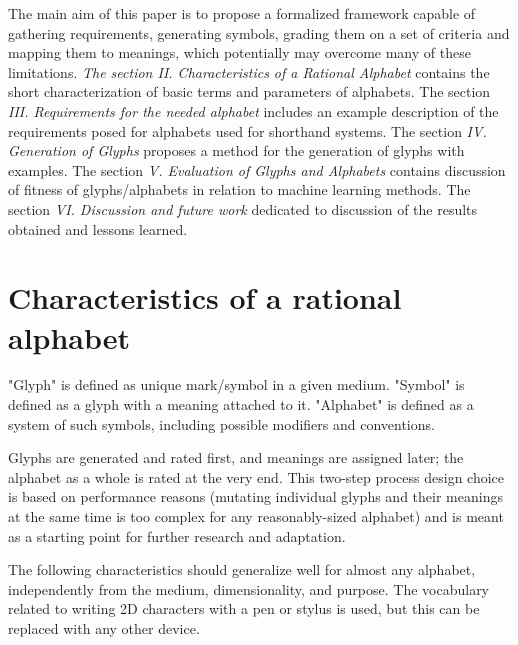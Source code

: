 \documentclass[conference]{IEEEtran}
\begin{document}
The main aim of this paper is to propose a formalized framework capable of gathering requirements,
generating symbols, grading them on a set of criteria and mapping them to meanings, which potentially may overcome many of these limitations. \emph{The section II. Characteristics of a Rational Alphabet} contains the short characterization of basic terms and parameters of alphabets. The section \emph{III. Requirements for the needed alphabet} includes an example description of the requirements posed for alphabets used for shorthand systems. The section \emph{IV. Generation of
Glyphs} proposes
a method for the generation of glyphs with examples. The section \emph{V. Evaluation of Glyphs and Alphabets} contains discussion of fitness of glyphs/alphabets in relation to machine learning methods. The section \emph{VI. Discussion and future work} dedicated to discussion of the results obtained and lessons learned. 

\section{Characteristics of a rational alphabet}
"Glyph" is defined as unique mark/symbol in a given medium. "Symbol" is defined as a glyph with a meaning attached to it. "Alphabet" is defined as a system of such symbols, including possible modifiers and conventions.

Glyphs are generated and rated first, and meanings are assigned later; the alphabet as a whole is rated at the very end. This two-step process design choice is based on performance reasons (mutating individual glyphs and their meanings at the same time is too complex for any reasonably-sized alphabet) and is meant as a starting point for further research and adaptation. 



The following characteristics should generalize well for almost any alphabet, independently from the medium, dimensionality, and purpose. The vocabulary related to writing 2D characters with a pen or stylus is used, but this can be replaced with any other device.  
\end{document}
